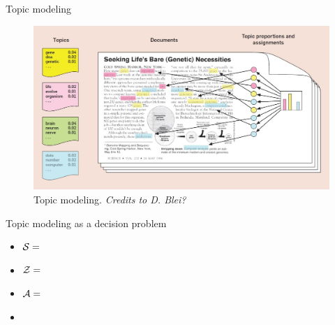 \documentclass[10pt]{beamer}
\begin{document}
\begin{frame}{Topic modeling}
  \begin{figure}
    \includegraphics[width=\onefig]{Figures/lda.jpg}
  \caption{Topic modeling. \emph{Credits to D. Blei?}}
  \end{figure}
\end{frame}

\begin{frame}{Topic modeling as a decision problem}
    \begin{itemize}
       \item $\mathcal{S} = $
       \item $\mathcal{Z} = $
       \item $\mathcal{A} = $
       \item
    \end{itemize}
    \blank
\end{frame}
        
\end{document}
